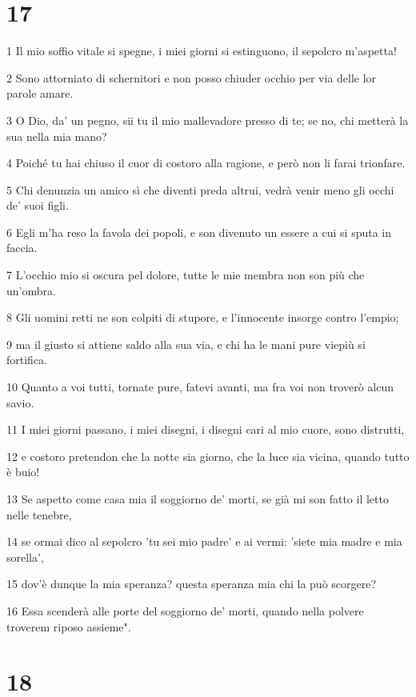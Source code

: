 \chapter{17}

\par 1 Il mio soffio vitale si spegne, i miei giorni si estinguono, il sepolcro m'aspetta!
\par 2 Sono attorniato di schernitori e non posso chiuder occhio per via delle lor parole amare.
\par 3 O Dio, da' un pegno, sii tu il mio mallevadore presso di te; se no, chi metterà la sua nella mia mano?
\par 4 Poiché tu hai chiuso il cuor di costoro alla ragione, e però non li farai trionfare.
\par 5 Chi denunzia un amico sì che diventi preda altrui, vedrà venir meno gli occhi de' suoi figli.
\par 6 Egli m'ha reso la favola dei popoli, e son divenuto un essere a cui si sputa in faccia.
\par 7 L'occhio mio si oscura pel dolore, tutte le mie membra non son più che un'ombra.
\par 8 Gli uomini retti ne son colpiti di stupore, e l'innocente insorge contro l'empio;
\par 9 ma il giusto si attiene saldo alla sua via, e chi ha le mani pure viepiù si fortifica.
\par 10 Quanto a voi tutti, tornate pure, fatevi avanti, ma fra voi non troverò alcun savio.
\par 11 I miei giorni passano, i miei disegni, i disegni cari al mio cuore, sono distrutti,
\par 12 e costoro pretendon che la notte sia giorno, che la luce sia vicina, quando tutto è buio!
\par 13 Se aspetto come casa mia il soggiorno de' morti, se già mi son fatto il letto nelle tenebre,
\par 14 se ormai dico al sepolcro 'tu sei mio padre' e ai vermi: 'siete mia madre e mia sorella',
\par 15 dov'è dunque la mia speranza? questa speranza mia chi la può scorgere?
\par 16 Essa scenderà alle porte del soggiorno de' morti, quando nella polvere troverem riposo assieme".

\chapter{18}

